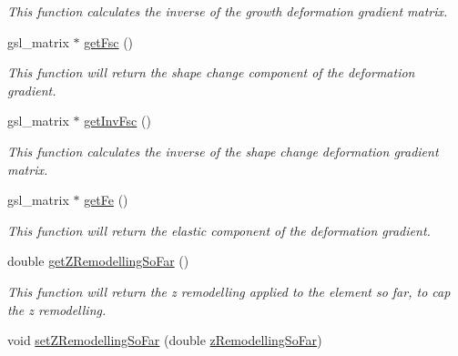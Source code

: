 \begin{DoxyCompactItemize}
\begin{DoxyCompactList}\small\item\em This function calculates the inverse of the growth deformation gradient matrix. \end{DoxyCompactList}\item 
\hypertarget{classShapeBase_ab261573ddd6829df0ee104260352c7ae}{}gsl\+\_\+matrix $\ast$ \hyperlink{classShapeBase_ab261573ddd6829df0ee104260352c7ae}{get\+Fsc} ()\label{classShapeBase_ab261573ddd6829df0ee104260352c7ae}

\begin{DoxyCompactList}\small\item\em This function will return the shape change component of the deformation gradient. \end{DoxyCompactList}\item 
\hypertarget{classShapeBase_a884da8f201986aaef5c27efdd4a5b7d4}{}gsl\+\_\+matrix $\ast$ \hyperlink{classShapeBase_a884da8f201986aaef5c27efdd4a5b7d4}{get\+Inv\+Fsc} ()\label{classShapeBase_a884da8f201986aaef5c27efdd4a5b7d4}

\begin{DoxyCompactList}\small\item\em This function calculates the inverse of the shape change deformation gradient matrix. \end{DoxyCompactList}\item 
\hypertarget{classShapeBase_a26de227e5135a355667be3a2a86d1431}{}gsl\+\_\+matrix $\ast$ \hyperlink{classShapeBase_a26de227e5135a355667be3a2a86d1431}{get\+Fe} ()\label{classShapeBase_a26de227e5135a355667be3a2a86d1431}

\begin{DoxyCompactList}\small\item\em This function will return the elastic component of the deformation gradient. \end{DoxyCompactList}\item 
\hypertarget{classShapeBase_a4916a23d305f1258ec83b7e53adabea1}{}double \hyperlink{classShapeBase_a4916a23d305f1258ec83b7e53adabea1}{get\+Z\+Remodelling\+So\+Far} ()\label{classShapeBase_a4916a23d305f1258ec83b7e53adabea1}

\begin{DoxyCompactList}\small\item\em This function will return the z remodelling applied to the element so far, to cap the z remodelling. \end{DoxyCompactList}\item 
\hypertarget{classShapeBase_ad225c2235e531e5ee239a127bbf92def}{}void \hyperlink{classShapeBase_ad225c2235e531e5ee239a127bbf92def}{set\+Z\+Remodelling\+So\+Far} (double \hyperlink{classShapeBase_a0dc566eb70e64da9fc3fa222b16999da}{z\+Remodelling\+So\+Far})\label{classShapeBase_ad225c2235e531e5ee239a127bbf92def}


\end{DoxyCompactItemize}

